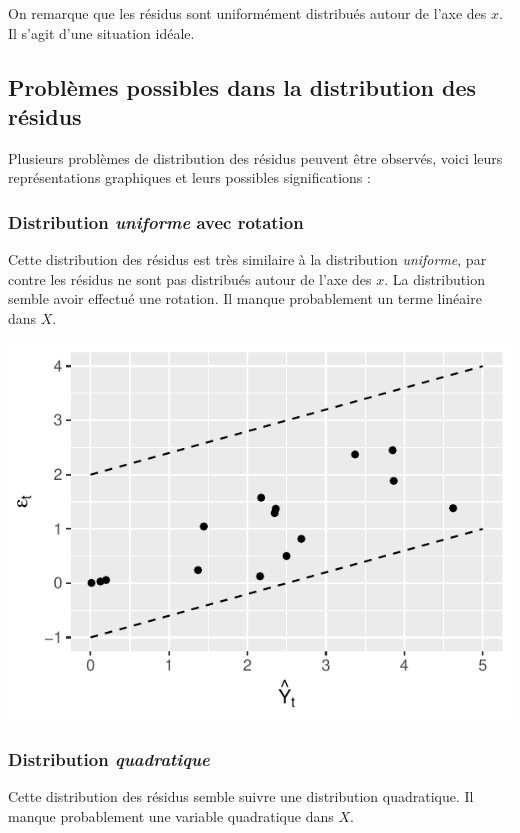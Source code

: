 \documentclass[11pt,french]{report}
\begin{document}
\bigskip
On remarque que les résidus sont uniformément distribués autour de l'axe des $x$. Il s'agit d'une situation idéale.

\subsection{Problèmes possibles dans la distribution des résidus}
Plusieurs problèmes de distribution des résidus peuvent être observés, voici leurs représentations graphiques et leurs possibles significations :

\subsubsection{Distribution \emph{uniforme} avec rotation}
Cette distribution des résidus est très similaire à la distribution \emph{uniforme}, par contre les résidus ne sont pas distribués autour de l'axe des $x$. La distribution semble avoir effectué une rotation. Il manque probablement un terme linéaire dans $X$.

\bigskip
\includegraphics{notes_de_cours-032}
\bigskip

\subsubsection{Distribution \emph{quadratique}}
Cette distribution des résidus semble suivre une distribution quadratique. Il manque probablement une variable quadratique dans $X$.
\end{document}

